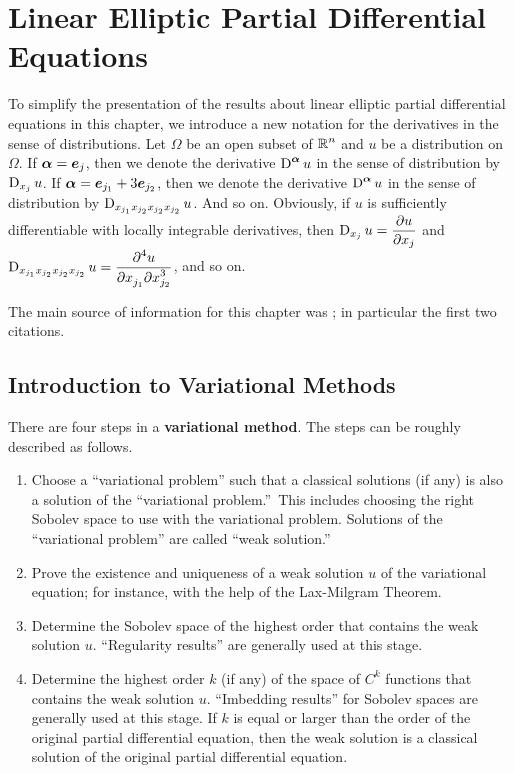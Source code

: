 \chapter{Linear Elliptic Partial Differential Equations}
\label{elliptic_PDEs}

To simplify the presentation of the results about linear elliptic partial
differential equations in this chapter, we introduce a new notation
for the derivatives in the sense of distributions. Let $\Omega$ be an
open subset of $\displaystyle \RR^n$ and $u$ be a distribution on $\Omega$.  If
$\VEC{\alpha} = \VEC{e}_j$, then we denote the derivative
$\diff^{\VEC{\alpha}} u$ in the sense of distribution by $\diff_{x_j} u$.  If
$\VEC{\alpha} = \VEC{e}_{j_1} + 3 \VEC{e}_{j_2}$,
then we denote the derivative $\displaystyle \diff^{\VEC{\alpha}} u$ in the
sense of distribution by $\diff_{x_{j_1}x_{j_2}x_{j_2}x_{j_2}} u$.  And so on.
Obviously, if $u$ is sufficiently differentiable with locally
integrable derivatives, then $\displaystyle \diff_{x_j} u = \pdydx{u}{x_j}$
and $\displaystyle \diff_{x_{j_1}x_{j_2}x_{j_2}x_{j_2}} u
= \pdydxnm{u}{x_{j_1}}{x_{j_2}}{4}{}{3}$, and so on.

The main source of information for this chapter was
\cite{Br,FoPDE,RenRog,Tr}; in particular the first two
citations.

\section{Introduction to Variational Methods}

There are four steps in a {\bfseries variational method}.  The steps
can be roughly described as follows.
\begin{enumerate}
\item Choose a ``variational problem'' such that a
classical solutions (if any) is also a solution of the
``variational problem.''\  This includes choosing the right Sobolev
space to use with the variational problem.  Solutions of the
``variational problem'' are called ``weak solution.''
\item Prove the existence and uniqueness of a weak solution $u$ of the
variational equation; for instance, with the help of the Lax-Milgram Theorem.
\item \label{ell_wsd1} Determine the Sobolev space of the highest
order that contains the weak solution $u$.  ``Regularity results''
are generally used at this stage.
\item Determine the highest order $k$ (if any) of the space of
$\displaystyle C^k$ functions that contains the weak solution $u$.
``Imbedding results'' for Sobolev spaces are generally used at this stage.
If $k$ is equal or larger than the order of the original partial
differential equation, then the weak solution is a classical solution
of the original partial differential equation.
\end{enumerate}

